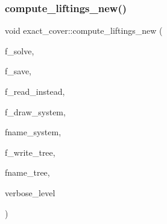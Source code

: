 \mbox{\label{classexact__cover_a1438b5e280f85abcabeb7f68eeabb72b}} 
\subsubsection{\texorpdfstring{compute\+\_\+liftings\+\_\+new()}{compute\_liftings\_new()}}
{\footnotesize\ttfamily void exact\+\_\+cover\+::compute\+\_\+liftings\+\_\+new (\begin{DoxyParamCaption}\item[{\mbox{\hyperlink{galois_8h_a09fddde158a3a20bd2dcadb609de11dc}{I\+NT}}}]{f\+\_\+solve,  }\item[{\mbox{\hyperlink{galois_8h_a09fddde158a3a20bd2dcadb609de11dc}{I\+NT}}}]{f\+\_\+save,  }\item[{\mbox{\hyperlink{galois_8h_a09fddde158a3a20bd2dcadb609de11dc}{I\+NT}}}]{f\+\_\+read\+\_\+instead,  }\item[{\mbox{\hyperlink{galois_8h_a09fddde158a3a20bd2dcadb609de11dc}{I\+NT}}}]{f\+\_\+draw\+\_\+system,  }\item[{const \mbox{\hyperlink{galois_8h_ab6cc7b4aeb6ea31aba2b3fbfc83ff5e6}{B\+Y\+TE}} $\ast$}]{fname\+\_\+system,  }\item[{\mbox{\hyperlink{galois_8h_a09fddde158a3a20bd2dcadb609de11dc}{I\+NT}}}]{f\+\_\+write\+\_\+tree,  }\item[{const \mbox{\hyperlink{galois_8h_ab6cc7b4aeb6ea31aba2b3fbfc83ff5e6}{B\+Y\+TE}} $\ast$}]{fname\+\_\+tree,  }\item[{\mbox{\hyperlink{galois_8h_a09fddde158a3a20bd2dcadb609de11dc}{I\+NT}}}]{verbose\+\_\+level }\end{DoxyParamCaption})}

\mbox{\label{classexact__cover_ab111dd375f84d6f60ec7edeb2b18523e}} 
